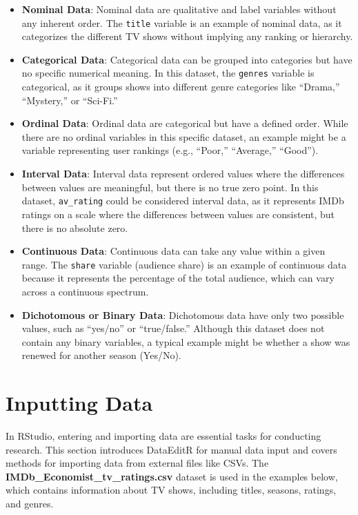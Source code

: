 \documentclass[
]{book}
\begin{document}
\begin{itemize}
\item
  \textbf{Nominal Data}: Nominal data are qualitative and label variables without any inherent order. The \texttt{title} variable is an example of nominal data, as it categorizes the different TV shows without implying any ranking or hierarchy.
\item
  \textbf{Categorical Data}: Categorical data can be grouped into categories but have no specific numerical meaning. In this dataset, the \texttt{genres} variable is categorical, as it groups shows into different genre categories like ``Drama,'' ``Mystery,'' or ``Sci-Fi.''
\item
  \textbf{Ordinal Data}: Ordinal data are categorical but have a defined order. While there are no ordinal variables in this specific dataset, an example might be a variable representing user rankings (e.g., ``Poor,'' ``Average,'' ``Good'').
\item
  \textbf{Interval Data}: Interval data represent ordered values where the differences between values are meaningful, but there is no true zero point. In this dataset, \texttt{av\_rating} could be considered interval data, as it represents IMDb ratings on a scale where the differences between values are consistent, but there is no absolute zero.
\item
  \textbf{Continuous Data}: Continuous data can take any value within a given range. The \texttt{share} variable (audience share) is an example of continuous data because it represents the percentage of the total audience, which can vary across a continuous spectrum.
\item
  \textbf{Dichotomous or Binary Data}: Dichotomous data have only two possible values, such as ``yes/no'' or ``true/false.'' Although this dataset does not contain any binary variables, a typical example might be whether a show was renewed for another season (Yes/No).
\end{itemize}

\section{Inputting Data}\label{inputting-data}

In RStudio, entering and importing data are essential tasks for conducting research. This section introduces DataEditR for manual data input and covers methods for importing data from external files like CSVs. The \textbf{IMDb\_Economist\_tv\_ratings.csv} dataset is used in the examples below, which contains information about TV shows, including titles, seasons, ratings, and genres.
\end{document}

